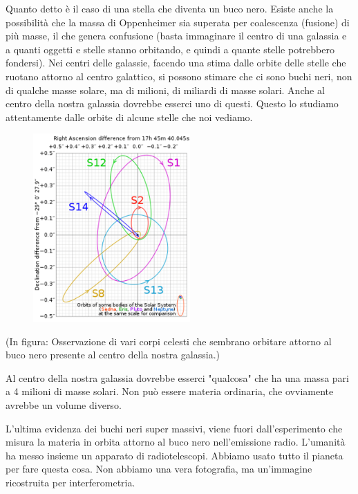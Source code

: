 Quanto detto è il caso di una stella che diventa un buco nero. Esiste anche la possibilità che la massa di Oppenheimer sia superata per coalescenza (fusione) di più masse, il che genera confusione (basta immaginare il centro di una galassia e a quanti oggetti e stelle stanno orbitando, e quindi a quante stelle potrebbero fondersi). Nei centri delle galassie, facendo una stima dalle orbite delle stelle che ruotano attorno al centro galattico, si possono stimare che ci sono buchi neri, non di qualche masse solare, ma di milioni, di miliardi di masse solari. Anche al centro della nostra galassia dovrebbe esserci uno di questi. Questo lo studiamo attentamente dalle orbite di alcune stelle che noi vediamo.

\begin{figure}[H]
    \centering
    \includegraphics[width=6cm]{lezione 28 novembre/centrogalattico.png}
    \label{lezione 28 novembre/centrogalattico.png}
\end{figure}

(In figura: Osservazione di vari corpi celesti che sembrano orbitare attorno al buco nero presente al centro della nostra galassia.)

Al centro della nostra galassia dovrebbe esserci "qualcosa" che ha una massa pari a 4 milioni di masse solari. Non può essere materia ordinaria, che ovviamente avrebbe un volume diverso.

L'ultima evidenza dei buchi neri super massivi, viene fuori dall'esperimento che misura la materia in orbita attorno al buco nero nell'emissione radio. L'umanità ha messo insieme un apparato di radiotelescopi. Abbiamo usato tutto il pianeta per fare questa cosa. Non abbiamo una vera fotografia, ma un'immagine ricostruita per interferometria.


